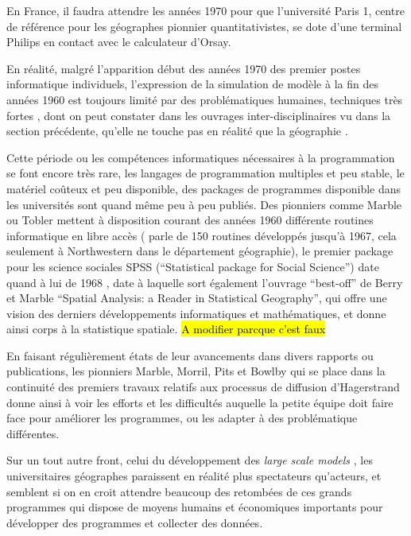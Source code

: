 En France, il faudra attendre les années 1970 pour que l'université Paris 1, centre de référence pour les géographes pionnier quantitativistes, se dote d'une terminal Philips en contact avec le calculateur d'Orsay.

En réalité, malgré l'apparition début des années 1970 des premier postes informatique individuels, l'expression de la simulation de modèle à la fin des années 1960 est toujours limité par des problématiques humaines, techniques très fortes \autocite{Haggett1969} \autocite[387]{Marble1972}, dont on peut constater dans les ouvrages inter-disciplinaires vu dans la section précédente, qu'elle ne touche pas en réalité que la géographie \autocite{Guetzkow1972}.

Cette période ou les compétences informatiques nécessaires à la programmation se font encore très rare, les langages de programmation multiples et peu stable, le matériel coûteux et peu disponible, des packages de programmes disponible dans les universités sont quand même peu à peu publiés. Des pionniers comme Marble ou Tobler mettent à disposition courant des années 1960 différente routines informatique en libre accès \autocite{Haggett1969}  (\textcite[3]{Marble1967} parle de 150 routines développés jusqu'à 1967, cela seulement à Northwestern dans le département géographie), le premier package pour les science sociales SPSS (\foreignquote{english}{Statistical package for Social Science}) date quand à lui de 1968 \autocite{Barnes2011}, date à laquelle sort également l'ouvrage \foreignquote{english}{best-off} de Berry et Marble \foreignquote{english}{Spatial Analysis: a Reader in Statistical Geography}, qui offre une vision des derniers développements informatiques et mathématiques, et donne ainsi corps à la statistique spatiale. \hl{A modifier parcque c'est faux}

En faisant régulièrement états de leur avancements dans divers rapports ou publications, les pionniers Marble, Morril, Pits et Bowlby \autocite{Pitts1963} qui se place dans la continuité des premiers travaux relatifs aux processus de diffusion d'Hagerstrand \autocite{Hagerstrand1953, Hagerstrand1967a} donne ainsi à voir les efforts et les difficultés auquelle la petite équipe doit faire face pour améliorer les programmes, ou les adapter à des problématique différentes.

Sur un tout autre front, celui du développement des \textit{large scale models} \autocite[8]{Batty1976} \autocite[11]{Batty1994}, les universitaires géographes paraissent en réalité plus spectateurs qu'acteurs, et semblent si on en croit \textcite{Haggett1969} attendre beaucoup des retombées de ces grands programmes qui dispose de moyens humains et économiques importants pour développer des programmes et collecter des données.

